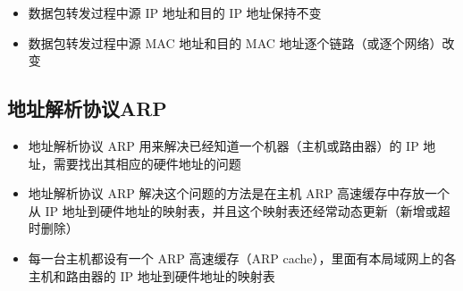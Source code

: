 \documentclass[cs4size,a4paper,10pt]{ctexart}
\begin{document}
	\begin{itemize}
		\item 数据包转发过程中源 IP 地址和目的 IP 地址保持不变
		\item 数据包转发过程中源 MAC 地址和目的 MAC 地址逐个链路（或逐个网络）改变
	\end{itemize}

	\subsection{地址解析协议ARP}

	\begin{itemize}
		\item 地址解析协议 ARP 用来解决已经知道一个机器（主机或路由器）的 IP 地址，需要找出其相应的硬件地址的问题
		\item 地址解析协议 ARP 解决这个问题的方法是在主机 ARP 高速缓存中存放一个从 IP 地址到硬件地址的映射表，并且这个映射表还经常动态更新（新增或超时删除）
		\item 每一台主机都设有一个 ARP 高速缓存（ARP cache），里面有本局域网上的各主机和路由器的 IP 地址到硬件地址的映射表
	\end{itemize}
\end{document}
